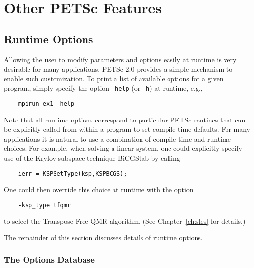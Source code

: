 {%
\chapter{Other PETSc Features}

\section{Runtime Options}  
\label{sec:options}

Allowing the user to modify parameters and options easily at runtime
is very desirable for many applications.  PETSc 2.0 provides a simple
mechanism to enable such customization.  To print a list of
available options for a given program, simply specify the option 
{\tt -help} (or {\tt -h}) at runtime, e.g.,  
\begin{verbatim}
    mpirun ex1 -help
\end{verbatim}

Note that all runtime options correspond to particular PETSc routines
that can be explicitly called from within a program to set compile-time
defaults.   For many applications it is natural to use a combination
of compile-time and runtime choices.  For example, when solving a linear
system, one could explicitly specify use of the Krylov subspace
technique BiCGStab by calling
\begin{verbatim}
    ierr = KSPSetType(ksp,KSPBCGS);
\end{verbatim}
One could then override this choice at runtime with the option
\begin{verbatim}
    -ksp_type tfqmr
\end{verbatim}
to select the Transpose-Free QMR algorithm. (See Chapter~\ref{ch:sles} for details.)

The remainder of this section discusses details of runtime options.

\subsection{The Options Database}

}
